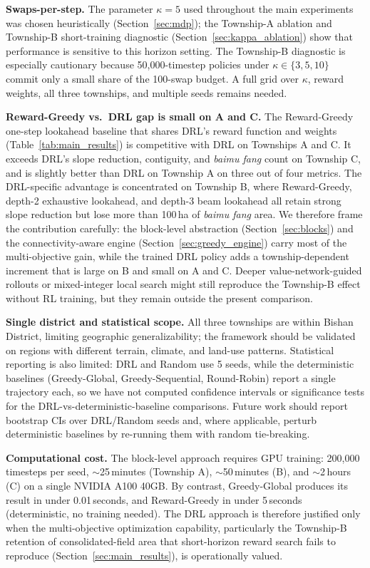 \documentclass[preprint,12pt]{elsarticle}
\begin{document}
\textbf{Swaps-per-step.} The parameter $\kappa = 5$ used throughout the main experiments was chosen heuristically (Section~\ref{sec:mdp}); the Township-A ablation and Township-B short-training diagnostic (Section~\ref{sec:kappa_ablation}) show that performance is sensitive to this horizon setting. The Township-B diagnostic is especially cautionary because 50{,}000-timestep policies under $\kappa\in\{3,5,10\}$ commit only a small share of the 100-swap budget. A full grid over $\kappa$, reward weights, all three townships, and multiple seeds remains needed.

\textbf{Reward-Greedy vs.\ DRL gap is small on A and C.} The Reward-Greedy one-step lookahead baseline that shares DRL's reward function and weights (Table~\ref{tab:main_results}) is competitive with DRL on Townships A and C. It exceeds DRL's slope reduction, contiguity, and \textit{baimu fang} count on Township C, and is slightly better than DRL on Township A on three out of four metrics. The DRL-specific advantage is concentrated on Township B, where Reward-Greedy, depth-2 exhaustive lookahead, and depth-3 beam lookahead all retain strong slope reduction but lose more than 100\,ha of \textit{baimu fang} area. We therefore frame the contribution carefully: the block-level abstraction (Section~\ref{sec:blocks}) and the connectivity-aware engine (Section~\ref{sec:greedy_engine}) carry most of the multi-objective gain, while the trained DRL policy adds a township-dependent increment that is large on B and small on A and C. Deeper value-network-guided rollouts or mixed-integer local search might still reproduce the Township-B effect without RL training, but they remain outside the present comparison.

\textbf{Single district and statistical scope.} All three townships are within Bishan District, limiting geographic generalizability; the framework should be validated on regions with different terrain, climate, and land-use patterns. Statistical reporting is also limited: DRL and Random use 5 seeds, while the deterministic baselines (Greedy-Global, Greedy-Sequential, Round-Robin) report a single trajectory each, so we have not computed confidence intervals or significance tests for the DRL-vs-deterministic-baseline comparisons. Future work should report bootstrap CIs over DRL/Random seeds and, where applicable, perturb deterministic baselines by re-running them with random tie-breaking.

\textbf{Computational cost.} The block-level approach requires GPU training: 200{,}000 timesteps per seed, $\sim$25\,minutes (Township A), $\sim$50\,minutes (B), and $\sim$2\,hours (C) on a single NVIDIA A100 40GB. By contrast, Greedy-Global produces its result in under 0.01\,seconds, and Reward-Greedy in under 5\,seconds (deterministic, no training needed). The DRL approach is therefore justified only when the multi-objective optimization capability, particularly the Township-B retention of consolidated-field area that short-horizon reward search fails to reproduce (Section~\ref{sec:main_results}), is operationally valued.
\end{document}
